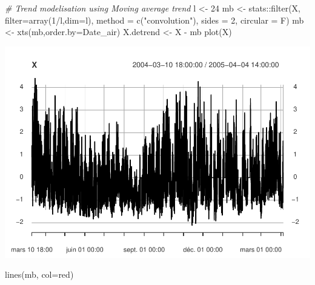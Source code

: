 \documentclass[
]{article}
\newenvironment{Shaded}{\begin{snugshade}}{\end{snugshade}}
\newcommand{\AttributeTok}[1]{\textcolor[rgb]{0.77,0.63,0.00}{#1}}
\newcommand{\CommentTok}[1]{\textcolor[rgb]{0.56,0.35,0.01}{\textit{#1}}}
\newcommand{\DecValTok}[1]{\textcolor[rgb]{0.00,0.00,0.81}{#1}}
\newcommand{\FunctionTok}[1]{\textcolor[rgb]{0.00,0.00,0.00}{#1}}
\newcommand{\NormalTok}[1]{#1}
\newcommand{\OtherTok}[1]{\textcolor[rgb]{0.56,0.35,0.01}{#1}}
\newcommand{\SpecialCharTok}[1]{\textcolor[rgb]{0.00,0.00,0.00}{#1}}
\newcommand{\StringTok}[1]{\textcolor[rgb]{0.31,0.60,0.02}{#1}}
\begin{document}
\begin{Shaded}
\begin{Highlighting}[]
\CommentTok{\# Trend modelisation using Moving average trend}
\NormalTok{l }\OtherTok{\textless{}{-}} \DecValTok{24}
\NormalTok{mb }\OtherTok{\textless{}{-}}\NormalTok{ stats}\SpecialCharTok{::}\FunctionTok{filter}\NormalTok{(X, }\AttributeTok{filter=}\FunctionTok{array}\NormalTok{(}\DecValTok{1}\SpecialCharTok{/}\NormalTok{l,}\AttributeTok{dim=}\NormalTok{l),}
                  \AttributeTok{method =} \FunctionTok{c}\NormalTok{(}\StringTok{"convolution"}\NormalTok{),}
                  \AttributeTok{sides =} \DecValTok{2}\NormalTok{, }\AttributeTok{circular =}\NormalTok{ F)}
\NormalTok{mb }\OtherTok{\textless{}{-}} \FunctionTok{xts}\NormalTok{(mb,}\AttributeTok{order.by=}\NormalTok{Date\_air)}
\NormalTok{X.detrend }\OtherTok{\textless{}{-}}\NormalTok{ X }\SpecialCharTok{{-}}\NormalTok{ mb}
\FunctionTok{plot}\NormalTok{(X)}
\end{Highlighting}
\end{Shaded}

\includegraphics{STA202_report_files/figure-latex/unnamed-chunk-12-6.pdf}

\begin{Shaded}
\begin{Highlighting}[]
\FunctionTok{lines}\NormalTok{(mb, }\AttributeTok{col=}\StringTok{\textquotesingle{}red\textquotesingle{}}\NormalTok{)}
\end{Highlighting}
\end{Shaded}
\end{document}
